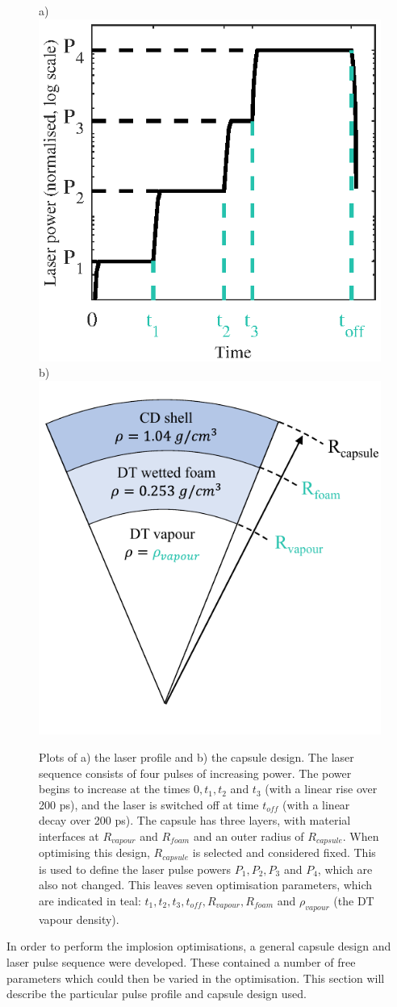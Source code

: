 \begin{figure} 
\centering     %
\subfigure a)\includegraphics[width=.45\textwidth]{figures/LowCR/LaserProfile_half.eps}
\subfigure b)\includegraphics[width=.45\textwidth]{figures/LowCR/Capsule.pdf}
\caption{\label{fig:CapsuleAndLaserProfile}Plots of a) the laser profile and b) the capsule design. The laser sequence consists of four pulses of increasing power. The power begins to increase at the times $0, t_1, t_2$ and $t_3$ (with a linear rise over 200 \unit{\pico\second}), and the laser is switched off at time $t_{off}$ (with a linear decay over 200 \unit{\pico\second}). The capsule has three layers, with material interfaces at $R_{vapour}$ and $R_{foam}$ and an outer radius of $R_{capsule}$. When optimising this design, $R_{capsule}$ is selected and considered fixed. This is used to define the laser pulse powers $P_1, P_2, P_3$ and $P_4$, which are also not changed. This leaves seven optimisation parameters, which are indicated in teal: $t_1, t_2, t_3, t_{off}, R_{vapour}, R_{foam}$ and $\rho_{vapour}$ (the DT vapour density).}
\end{figure}

In order to perform the implosion optimisations, a general capsule design and laser pulse sequence were developed. These contained a number of free parameters which could then be varied in the optimisation. This section will describe the particular pulse profile and capsule design used.

